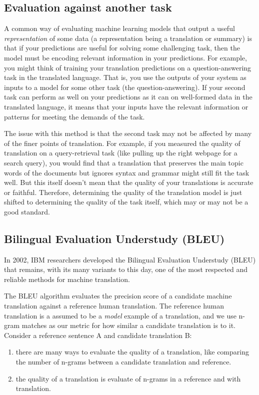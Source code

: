 \documentclass{tufte-handout}
\begin{document}
\subsection{Evaluation against another task}
A common way of evaluating machine learning models that output a useful \textit{representation} of some data (a representation being a translation or summary) is that if your predictions are useful for solving some challenging task, then the model must be encoding relevant information in your predictions.
For example, you might think of training your translation predictions on a question-answering task in the translated language. That is, you use the outputs of your system as inputs to a model for some other task (the question-answering). If your second task can perform as well on your predictions as it can on well-formed data in the translated language, it means that your inputs have the relevant information or patterns for meeting the demands of the task.

The issue with this method is that the second task may not be affected by many of the finer points of translation. For example, if you measured the quality of translation on a query-retrieval task (like pulling up the right webpage for a search query), you would find that a translation that preserves the main topic words of the documents but ignores syntax and grammar might still fit the task well. But this itself doesn't mean that the quality of your translations is accurate or faithful. Therefore, determining the quality of the translation model is just shifted to determining the quality of the task itself, which may or may not be a good standard.

\subsection{Bilingual Evaluation Understudy (BLEU)}
In 2002, IBM researchers developed the Bilingual Evaluation Understudy (BLEU) that remains, with its many variants to this day, one of the most respected and reliable methods for machine translation.

The BLEU algorithm evaluates the precision score of a candidate machine translation against a reference human translation. The reference human translation is a assumed to be a \textit{model} example of a translation, and we use n-gram matches as our metric for how similar a candidate translation is to it. Consider a reference sentence A and candidate translation B:

\begin{enumerate}[A]
\item there are many ways to evaluate the quality of a translation, like comparing the number of n-grams between a candidate translation and reference.
\item the quality of a translation is evaluate of n-grams in a reference and with translation.
\end{enumerate}
\end{document}
